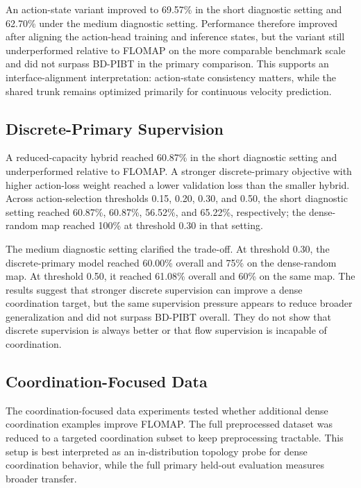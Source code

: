 \documentclass[conference]{IEEEtran}
\begin{document}
An action-state variant improved to 69.57\% in the short diagnostic setting and
62.70\% under the medium diagnostic setting.  Performance
therefore improved after aligning the action-head training and inference states,
but the variant still underperformed relative to FLOMAP on the
more comparable benchmark scale and did not surpass BD-PIBT in the primary
comparison.  This supports an interface-alignment interpretation:
action-state consistency matters, while the shared trunk remains optimized
primarily for continuous velocity prediction.

\subsection{Discrete-Primary Supervision}

A reduced-capacity hybrid reached 60.87\% in the short diagnostic setting
and underperformed relative to FLOMAP.  A stronger
discrete-primary objective with higher action-loss weight reached a lower
validation loss than the smaller hybrid.  Across action-selection thresholds
0.15, 0.20, 0.30, and 0.50, the
short diagnostic setting reached 60.87\%, 60.87\%, 56.52\%, and 65.22\%,
respectively; the dense-random map reached 100\% at threshold 0.30 in that
setting.

The medium diagnostic setting clarified the trade-off.  At threshold 0.30,
the discrete-primary model reached 60.00\% overall and 75\% on the dense-random
map.  At threshold 0.50, it reached 61.08\% overall and 60\% on the same map.
The results suggest that stronger discrete supervision can
improve a dense coordination target, but the same supervision pressure appears
to reduce broader
generalization and did not surpass BD-PIBT overall.  They do not show that
discrete supervision is always better or that flow supervision is incapable of
coordination.

\subsection{Coordination-Focused Data}

The coordination-focused data experiments tested whether additional dense
coordination examples improve FLOMAP.  The full preprocessed
dataset was reduced to a targeted coordination subset to keep preprocessing
tractable.  This setup is best interpreted as an
in-distribution topology probe for dense coordination behavior, while the full
primary held-out evaluation measures broader transfer.
\end{document}
